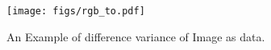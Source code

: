 \begin{figure}
    \centering
    \texttt{[image: figs/rgb\_to.pdf]}
    \caption{An Example of difference variance of Image as data.
    }
    \label{fig:gray_rgb}
    \vspace{-10pt}
\end{figure}